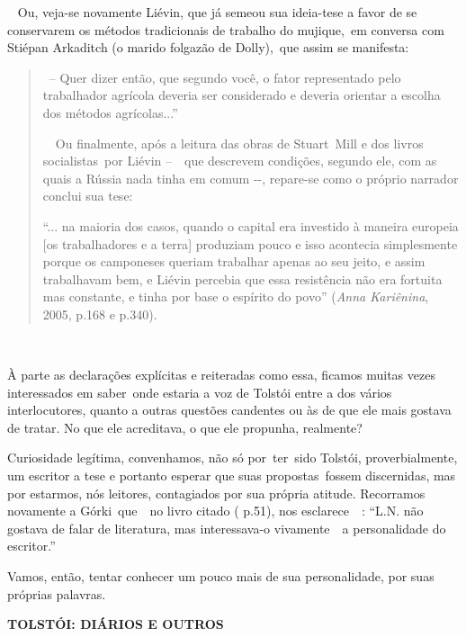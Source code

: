 \emph{~} Ou, veja-se novamente Liévin, que já semeou sua ideia-tese a
favor de se conservarem os métodos tradicionais de trabalho do
mujique,~em conversa com Stiépan Arkaditch (o marido folgazão de
Dolly),~que assim se manifesta:

\begin{quote}
~-- Quer dizer então, que segundo você, o fator representado pelo
trabalhador agrícola deveria ser considerado e deveria orientar a
escolha dos métodos agrícolas...''

~~Ou finalmente, após a leitura das obras de Stuart~Mill e dos livros
socialistas~por Liévin --~~que descrevem condições, segundo ele, com as
quais a Rússia nada tinha em comum -\/-, repare-se como o próprio
narrador conclui sua tese:

``... na maioria dos casos, quando o capital era investido à maneira
europeia {[}os trabalhadores e a terra{]} produziam pouco e isso
acontecia simplesmente porque os camponeses queriam trabalhar apenas ao
seu jeito, e assim trabalhavam bem, e Liévin percebia que essa
resistência não era fortuita mas constante, e tinha por base o espírito
do povo'' (\emph{Anna Kariênina}, 2005, p.168 e p.340).
\end{quote}

~

À parte as declarações explícitas e reiteradas como essa, ficamos muitas
vezes interessados em saber~onde estaria a voz de Tolstói entre a dos
vários interlocutores, quanto a outras questões candentes ou às de que
ele mais gostava de tratar. No que ele acreditava, o que ele propunha,
realmente?

Curiosidade legítima, convenhamos, não só por~ter~sido Tolstói,
proverbialmente, um escritor a tese e portanto esperar que suas
propostas~fossem discernidas, mas por estarmos, nós leitores,
contagiados por sua própria atitude. Recorramos novamente a
Górki~que~~no livro citado ( p.51), nos esclarece~~: ``L.N. não gostava
de falar de literatura, mas interessava-o vivamente~~a personalidade do
escritor.''

Vamos, então, tentar conhecer um pouco mais de sua personalidade, por
suas próprias palavras.

\textbf{TOLSTÓI: DIÁRIOS E OUTROS}

